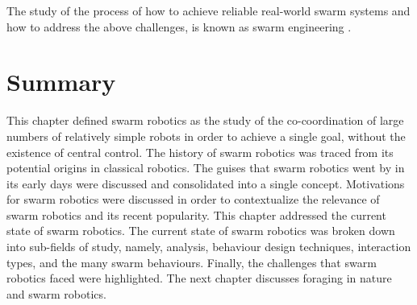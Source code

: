 The study of the process of how to achieve reliable real-world swarm systems and how to address the above challenges, is known as swarm engineering \cite{brambilla2013swarm}. %

\section{Summary}
\label{sec:first:summary}

This chapter defined swarm robotics as the study of the co-coordination of large numbers of relatively simple robots in order to achieve a single goal, without the existence of central control. The history of swarm robotics was traced from its potential origins in classical robotics. The guises that swarm robotics went by in its early days were discussed and consolidated into a single concept. Motivations for swarm robotics were discussed in order to contextualize the relevance of swarm robotics and its recent popularity. This chapter addressed the current state of swarm robotics. The current state of swarm robotics was broken down into sub-fields of study, namely, analysis, behaviour design techniques, interaction types, and the many swarm behaviours. Finally, the challenges that swarm robotics faced were highlighted. The next chapter discusses foraging in nature and swarm robotics.